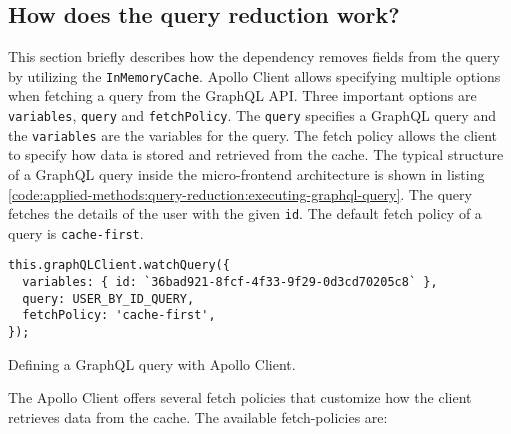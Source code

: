 \subsection{How does the query reduction work?}\label{subsection:applied-methods:query-reduction:how-does-the-library-work}

This section briefly describes how the dependency removes fields from the query by utilizing the \texttt{InMemoryCache}. Apollo Client allows specifying multiple options when fetching a query from the GraphQL \ac{API}. Three important options are \texttt{variables}, \texttt{query} and \texttt{fetchPolicy}. The \texttt{query} specifies a GraphQL query and the \texttt{variables} are the variables for the query. The fetch policy allows the client to specify how data is stored and retrieved from the cache. The typical structure of a GraphQL query inside the micro-frontend architecture is shown in listing \ref{code:applied-methods:query-reduction:executing-graphql-query}. The query fetches the details of the user with the given \texttt{id}. The default fetch policy of a query is \texttt{cache-first}.

\ifshowListings
\begin{listing}[H]
\begin{verbatim}
this.graphQLClient.watchQuery({
  variables: { id: `36bad921-8fcf-4f33-9f29-0d3cd70205c8` },
  query: USER_BY_ID_QUERY,
  fetchPolicy: 'cache-first',
});
\end{verbatim}
\caption{Defining a GraphQL query with Apollo Client.}\label{code:applied-methods:query-reduction:executing-graphql-query}
\end{listing}
\fi

\noindent The Apollo Client offers several fetch policies that customize how the client retrieves data from the cache. The available fetch-policies are: \cite{misc:-:applied-methods:query-reduction:apollo-client:queries}


